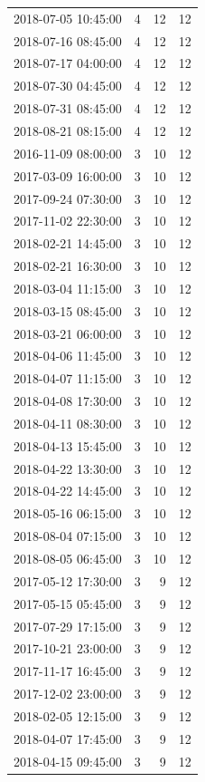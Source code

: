 \begin{tabular}{lrrr}
2018-07-05 10:45:00 & 4 & 12 & 12 \\
2018-07-16 08:45:00 & 4 & 12 & 12 \\
2018-07-17 04:00:00 & 4 & 12 & 12 \\
2018-07-30 04:45:00 & 4 & 12 & 12 \\
2018-07-31 08:45:00 & 4 & 12 & 12 \\
2018-08-21 08:15:00 & 4 & 12 & 12 \\
2016-11-09 08:00:00 & 3 & 10 & 12 \\
2017-03-09 16:00:00 & 3 & 10 & 12 \\
2017-09-24 07:30:00 & 3 & 10 & 12 \\
2017-11-02 22:30:00 & 3 & 10 & 12 \\
2018-02-21 14:45:00 & 3 & 10 & 12 \\
2018-02-21 16:30:00 & 3 & 10 & 12 \\
2018-03-04 11:15:00 & 3 & 10 & 12 \\
2018-03-15 08:45:00 & 3 & 10 & 12 \\
2018-03-21 06:00:00 & 3 & 10 & 12 \\
2018-04-06 11:45:00 & 3 & 10 & 12 \\
2018-04-07 11:15:00 & 3 & 10 & 12 \\
2018-04-08 17:30:00 & 3 & 10 & 12 \\
2018-04-11 08:30:00 & 3 & 10 & 12 \\
2018-04-13 15:45:00 & 3 & 10 & 12 \\
2018-04-22 13:30:00 & 3 & 10 & 12 \\
2018-04-22 14:45:00 & 3 & 10 & 12 \\
2018-05-16 06:15:00 & 3 & 10 & 12 \\
2018-08-04 07:15:00 & 3 & 10 & 12 \\
2018-08-05 06:45:00 & 3 & 10 & 12 \\
2017-05-12 17:30:00 & 3 & 9 & 12 \\
2017-05-15 05:45:00 & 3 & 9 & 12 \\
2017-07-29 17:15:00 & 3 & 9 & 12 \\
2017-10-21 23:00:00 & 3 & 9 & 12 \\
2017-11-17 16:45:00 & 3 & 9 & 12 \\
2017-12-02 23:00:00 & 3 & 9 & 12 \\
2018-02-05 12:15:00 & 3 & 9 & 12 \\
2018-04-07 17:45:00 & 3 & 9 & 12 \\
2018-04-15 09:45:00 & 3 & 9 & 12 \\

\end{tabular}
